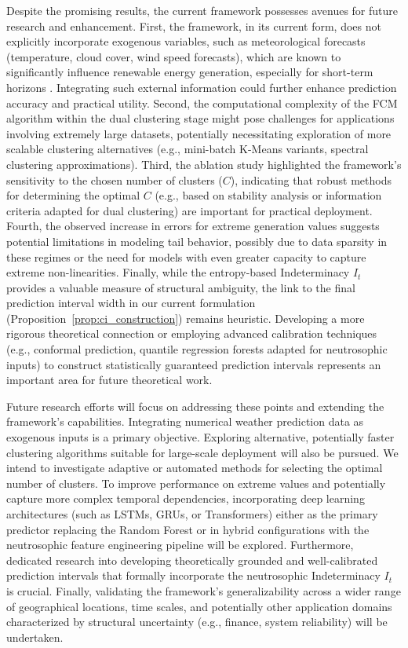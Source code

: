 \documentclass[review,3p,times]{elsarticle}
\begin{document}
Despite the promising results, the current framework possesses avenues for future research and enhancement. First, the framework, in its current form, does not explicitly incorporate exogenous variables, such as meteorological forecasts (temperature, cloud cover, wind speed forecasts), which are known to significantly influence renewable energy generation, especially for short-term horizons \cite{bauer2015quiet}. Integrating such external information could further enhance prediction accuracy and practical utility. Second, the computational complexity of the FCM algorithm within the dual clustering stage might pose challenges for applications involving extremely large datasets, potentially necessitating exploration of more scalable clustering alternatives (e.g., mini-batch K-Means variants, spectral clustering approximations). Third, the ablation study highlighted the framework's sensitivity to the chosen number of clusters ($C$), indicating that robust methods for determining the optimal $C$ (e.g., based on stability analysis or information criteria adapted for dual clustering) are important for practical deployment. Fourth, the observed increase in errors for extreme generation values suggests potential limitations in modeling tail behavior, possibly due to data sparsity in these regimes or the need for models with even greater capacity to capture extreme non-linearities. Finally, while the entropy-based Indeterminacy $I_t$ provides a valuable measure of structural ambiguity, the link to the final prediction interval width in our current formulation (Proposition~\ref{prop:ci_construction}) remains heuristic. Developing a more rigorous theoretical connection or employing advanced calibration techniques (e.g., conformal prediction, quantile regression forests adapted for neutrosophic inputs) to construct statistically guaranteed prediction intervals represents an important area for future theoretical work.

Future research efforts will focus on addressing these points and extending the framework's capabilities. Integrating numerical weather prediction data as exogenous inputs is a primary objective. Exploring alternative, potentially faster clustering algorithms suitable for large-scale deployment will also be pursued. We intend to investigate adaptive or automated methods for selecting the optimal number of clusters. To improve performance on extreme values and potentially capture more complex temporal dependencies, incorporating deep learning architectures (such as LSTMs, GRUs, or Transformers) either as the primary predictor replacing the Random Forest or in hybrid configurations with the neutrosophic feature engineering pipeline will be explored. Furthermore, dedicated research into developing theoretically grounded and well-calibrated prediction intervals that formally incorporate the neutrosophic Indeterminacy $I_t$ is crucial. Finally, validating the framework's generalizability across a wider range of geographical locations, time scales, and potentially other application domains characterized by structural uncertainty (e.g., finance, system reliability) will be undertaken.
\end{document}
